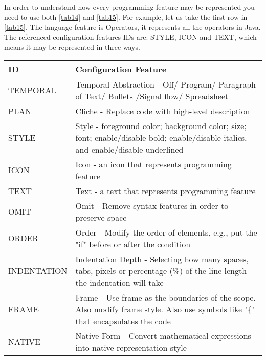 In order to understand how every programming feature may be represented you need to use both \autoref{tab14} and \autoref{tab15}. For example, let us take the first row in \autoref{tab15}. The language feature is Operators, it represents all the operators in Java. The referenced configuration features IDs are: STYLE, ICON and TEXT, which means it may be represented in three ways.
\begin{table}[H]
\centering
\begin{tabular}{|l|p{14cm}|}
\hline
\textbf{ID}  & \textbf{Configuration Feature}                                                                                            		  \\ \hline
TEMPORAL     & Temporal Abstraction - Off/ Program/ Paragraph of Text/ Bullets /Signal flow/ Spreadsheet                                          \\ \hline
PLAN         & Cliche - Replace code with high-level description                                                                                  \\ \hline
STYLE        & Style - foreground color; background color; size; font; enable/disable bold; enable/disable italics, and enable/disable underlined \\ \hline
ICON         & Icon - an icon that represents programming feature                                                                                 \\ \hline
TEXT         & Text - a text that represents programming feature                                                                                  \\ \hline
OMIT         & Omit - Remove syntax features in-order to preserve space                                                                           \\ \hline
ORDER        & Order - Modify the order of elements, e.g., put the "if" before or after the condition                                             \\ \hline
INDENTATION  & Indentation Depth - Selecting how many spaces, tabs, pixels or percentage (\%) of the line length the indentation will take        \\ \hline
FRAME        & Frame - Use frame as the boundaries of the scope. Also modify frame style. Also use symbols like "\{" that encapsulates the code   \\ \hline
NATIVE       & Native Form - Convert mathematical expressions into native representation style                                                    \\ \hline

\end{tabular}
\end{table}
